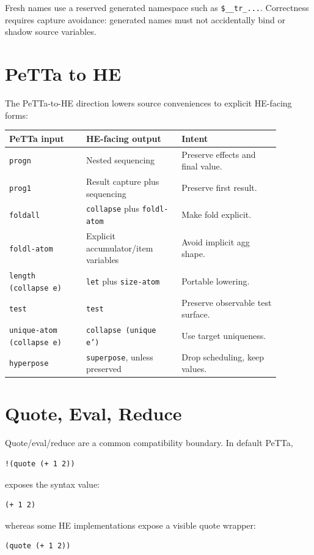 \documentclass[11pt]{article}
\newcommand{\code}[1]{\texttt{#1}}
\newcommand{\HE}{\textup{HE}}
\newcommand{\PeTTa}{\textup{PeTTa}}
\begin{document}
Fresh names use a reserved generated namespace such as \code{\$\_\_tr\_...}.
Correctness requires capture avoidance: generated names must not accidentally
bind or shadow source variables.

\section{\PeTTa{} to \HE{}}

The \PeTTa{}-to-\HE{} direction lowers source conveniences to explicit
\HE{}-facing forms:

\begin{center}
\begin{tabular}{>{\raggedright\arraybackslash}p{0.25\linewidth}
                >{\raggedright\arraybackslash}p{0.31\linewidth}
                >{\raggedright\arraybackslash}p{0.32\linewidth}}
\toprule
\PeTTa{} input & \HE{}-facing output & Intent \\
\midrule
\code{progn} & Nested sequencing & Preserve effects and final value. \\
\code{prog1} & Result capture plus sequencing & Preserve first result. \\
\code{foldall} & \code{collapse} plus \code{foldl-atom} & Make fold explicit. \\
\code{foldl-atom} & Explicit accumulator/item variables & Avoid implicit agg shape. \\
\code{length (collapse e)} & \code{let} plus \code{size-atom} & Portable lowering. \\
\code{test} & \code{test} & Preserve observable test surface. \\
\code{unique-atom (collapse e)} & \code{collapse (unique e')} & Use target uniqueness. \\
\code{hyperpose} & \code{superpose}, unless preserved & Drop scheduling, keep values. \\
\bottomrule
\end{tabular}
\end{center}

\section{Quote, Eval, Reduce}
\label{sec:quote}

Quote/eval/reduce are a common compatibility boundary.  In default \PeTTa{},
\begin{lstlisting}
!(quote (+ 1 2))
\end{lstlisting}
exposes the syntax value:
\begin{lstlisting}
(+ 1 2)
\end{lstlisting}
whereas some \HE{} implementations expose a visible quote wrapper:
\begin{lstlisting}
(quote (+ 1 2))
\end{lstlisting}
\end{document}
